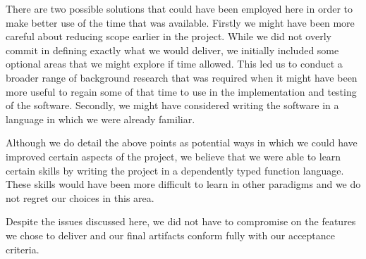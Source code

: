 There are two possible solutions that could have been employed here in
order to make better use of the time that was available. Firstly we
might have been more careful about reducing scope earlier in the
project. While we did not overly commit in defining exactly what we
would deliver, we initially included some optional areas that we might
explore if time allowed. This led us to conduct a broader range of
background research that was required when it might have been
more useful to regain some of that time to use in the implementation
and testing of the software. Secondly, we might have considered
writing the software in a language in which we were already familiar.

Although we do detail the above points as potential ways in which we
could have improved certain aspects of the project, we believe that we
were able to learn certain skills by writing the project in a
dependently typed function language. These skills would have been more
difficult to learn in other paradigms and we do not regret our choices
in this area.

Despite the issues discussed here, we did not have to compromise on
the features we chose to deliver and our final artifacts conform fully
with our acceptance criteria.

